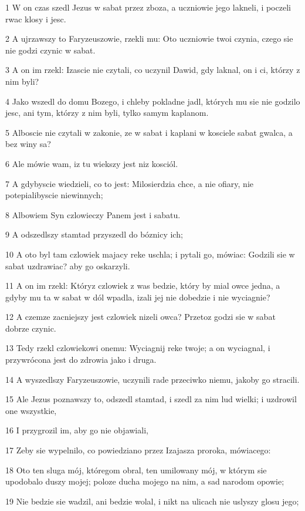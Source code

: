 \par 1 W on czas szedl Jezus w sabat przez zboza, a uczniowie jego lakneli, i poczeli rwac klosy i jesc.
\par 2 A ujrzawszy to Faryzeuszowie, rzekli mu: Oto uczniowie twoi czynia, czego sie nie godzi czynic w sabat.
\par 3 A on im rzekl: Izascie nie czytali, co uczynil Dawid, gdy laknal, on i ci, którzy z nim byli?
\par 4 Jako wszedl do domu Bozego, i chleby pokladne jadl, których mu sie nie godzilo jesc, ani tym, którzy z nim byli, tylko samym kaplanom.
\par 5 Alboscie nie czytali w zakonie, ze w sabat i kaplani w kosciele sabat gwalca, a bez winy sa?
\par 6 Ale mówie wam, iz tu wiekszy jest niz kosciól.
\par 7 A gdybyscie wiedzieli, co to jest: Milosierdzia chce, a nie ofiary, nie potepialibyscie niewinnych;
\par 8 Albowiem Syn czlowieczy Panem jest i sabatu.
\par 9 A odszedlszy stamtad przyszedl do bóznicy ich;
\par 10 A oto byl tam czlowiek majacy reke uschla; i pytali go, mówiac: Godzili sie w sabat uzdrawiac? aby go oskarzyli.
\par 11 A on im rzekl: Któryz czlowiek z was bedzie, który by mial owce jedna, a gdyby mu ta w sabat w dól wpadla, izali jej nie dobedzie i nie wyciagnie?
\par 12 A czemze zacniejszy jest czlowiek nizeli owca? Przetoz godzi sie w sabat dobrze czynic.
\par 13 Tedy rzekl czlowiekowi onemu: Wyciagnij reke twoje; a on wyciagnal, i przywrócona jest do zdrowia jako i druga.
\par 14 A wyszedlszy Faryzeuszowie, uczynili rade przeciwko niemu, jakoby go stracili.
\par 15 Ale Jezus poznawszy to, odszedl stamtad, i szedl za nim lud wielki; i uzdrowil one wszystkie,
\par 16 I przygrozil im, aby go nie objawiali,
\par 17 Zeby sie wypelnilo, co powiedziano przez Izajasza proroka, mówiacego:
\par 18 Oto ten sluga mój, któregom obral, ten umilowany mój, w którym sie upodobalo duszy mojej; poloze ducha mojego na nim, a sad narodom opowie;
\par 19 Nie bedzie sie wadzil, ani bedzie wolal, i nikt na ulicach nie uslyszy glosu jego;
